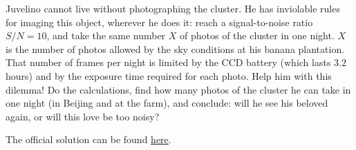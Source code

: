 \documentclass[11pt]{article}
\begin{document}
\begin{pproblem}
\begin{alternativas}
        \item Juvelino cannot live without photographing the cluster. He has inviolable rules for imaging this object, wherever he does it: reach a signal-to-noise ratio $S/N=10$, and take the same number $X$ of photos of the cluster in one night. $X$ is the number of photos allowed by the sky conditions at his banana plantation. That number of frames per night is limited by the CCD battery (which lasts $3.2$ hours) and by the exposure time required for each photo. Help him with this dilemma! Do the calculations, find how many photos of the cluster he can take in one night (in Beijing and at the farm), and conclude: will he see his beloved again, or will this love be too noisy?
    \end{alternativas}
\begin{pssolution*}{}{}
    The official solution can be found \href{https://drive.google.com/file/d/1q81Ba0RXA_L845xAE0uhVMecuhXAr2Ad/view?usp=sharing}{here}.
\end{pssolution*}
\end{pproblem}
\end{document}
